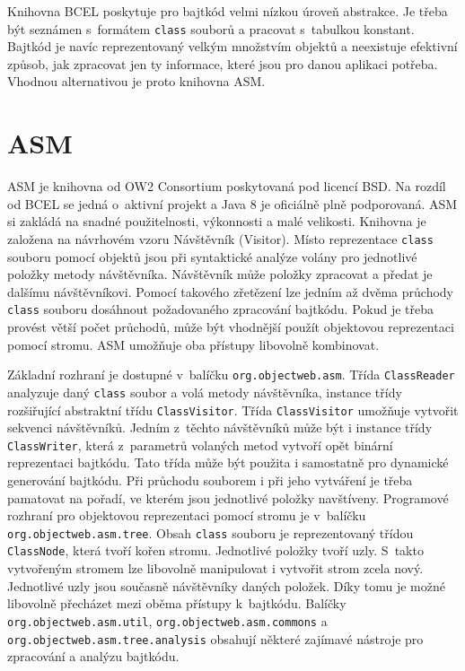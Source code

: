
Knihovna BCEL poskytuje pro bajtkód velmi nízkou úroveň abstrakce. Je třeba být seznámen s~formátem \texttt{class} souborů a pracovat s~tabulkou konstant. Bajtkód je navíc reprezentovaný velkým množstvím objektů a neexistuje efektivní způsob, jak zpracovat jen ty informace, které jsou pro danou aplikaci potřeba. Vhodnou alternativou je proto knihovna ASM.




\section{ASM}\label{Tools:ASM}

ASM \cite{ASM} je knihovna od OW2 Consortium poskytovaná pod licencí BSD. Na rozdíl od BCEL se jedná o~aktivní projekt a Java 8 je oficiálně plně podporovaná. ASM si zakládá na snadné použitelnosti, výkonnosti a malé velikosti. 
Knihovna je založena na návrhovém vzoru Návštěvník (Visitor). Místo reprezentace \texttt{class} souboru pomocí objektů jsou při syntaktické analýze volány pro jednotlivé položky metody návštěvníka. Návštěvník může položky zpracovat a předat je dalšímu návštěvníkovi. Pomocí takového zřetězení lze jedním až dvěma průchody \texttt{class} souboru dosáhnout požadovaného zpracování bajtkódu. Pokud je třeba provést větší počet průchodů, může být vhodnější použít objektovou reprezentaci pomocí stromu. ASM umožňuje oba přístupy libovolně kombinovat.

Základní rozhraní je dostupné v~balíčku \texttt{org.objectweb.asm}. Třída \texttt{ClassReader} analyzuje daný \texttt{class} soubor a volá metody návštěvníka, instance třídy rozšiřující abstraktní třídu \texttt{ClassVisitor}. Třída \texttt{ClassVisitor} umožňuje vytvořit sekvenci návštěvníků. Jedním z~těchto návštěvníků může být i instance třídy \texttt{ClassWriter}, která z~parametrů volaných metod vytvoří opět binární reprezentaci bajtkódu. Tato třída může být použita i samostatně pro dynamické generování bajtkódu. Při průchodu souborem i při jeho vytváření je třeba pamatovat na pořadí, ve kterém jsou jednotlivé položky navštíveny.
Programové rozhraní pro objektovou reprezentaci pomocí stromu je v~balíčku \texttt{org.objectweb.asm.tree}. Obsah \texttt{class} souboru je reprezentovaný třídou \texttt{ClassNode}, která tvoří kořen stromu. Jednotlivé položky tvoří uzly. S~takto vytvořeným stromem lze libovolně manipulovat i vytvořit strom zcela nový. Jednotlivé uzly jsou současně návštěvníky daných položek. Díky tomu je možné libovolně přecházet mezi oběma přístupy k~bajtkódu.
Balíčky \texttt{org.objectweb.asm.util}, \texttt{org.objectweb.asm.commons} a \texttt{org.objectweb.asm.tree.analysis} obsahují některé zajímavé nástroje pro zpracování a analýzu bajtkódu.

